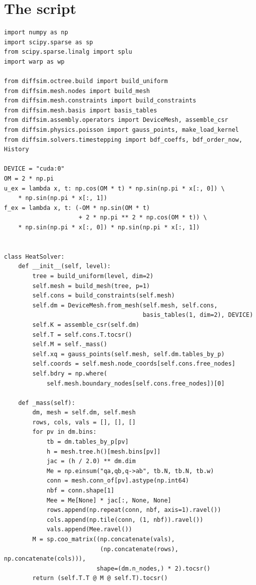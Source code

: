 \section*{The script}
\begin{lstlisting}
import numpy as np
import scipy.sparse as sp
from scipy.sparse.linalg import splu
import warp as wp

from diffsim.octree.build import build_uniform
from diffsim.mesh.nodes import build_mesh
from diffsim.mesh.constraints import build_constraints
from diffsim.mesh.basis import basis_tables
from diffsim.assembly.operators import DeviceMesh, assemble_csr
from diffsim.physics.poisson import gauss_points, make_load_kernel
from diffsim.solvers.timestepping import bdf_coeffs, bdf_order_now, History

DEVICE = "cuda:0"
OM = 2 * np.pi
u_ex = lambda x, t: np.cos(OM * t) * np.sin(np.pi * x[:, 0]) \
    * np.sin(np.pi * x[:, 1])
f_ex = lambda x, t: (-OM * np.sin(OM * t)
                     + 2 * np.pi ** 2 * np.cos(OM * t)) \
    * np.sin(np.pi * x[:, 0]) * np.sin(np.pi * x[:, 1])


class HeatSolver:
    def __init__(self, level):
        tree = build_uniform(level, dim=2)
        self.mesh = build_mesh(tree, p=1)
        self.cons = build_constraints(self.mesh)
        self.dm = DeviceMesh.from_mesh(self.mesh, self.cons,
                                       basis_tables(1, dim=2), DEVICE)
        self.K = assemble_csr(self.dm)
        self.T = self.cons.T.tocsr()
        self.M = self._mass()
        self.xq = gauss_points(self.mesh, self.dm.tables_by_p)
        self.coords = self.mesh.node_coords[self.cons.free_nodes]
        self.bdry = np.where(
            self.mesh.boundary_nodes[self.cons.free_nodes])[0]

    def _mass(self):
        dm, mesh = self.dm, self.mesh
        rows, cols, vals = [], [], []
        for pv in dm.bins:
            tb = dm.tables_by_p[pv]
            h = mesh.tree.h()[mesh.bins[pv]]
            jac = (h / 2.0) ** dm.dim
            Me = np.einsum("qa,qb,q->ab", tb.N, tb.N, tb.w)
            conn = mesh.conn_of[pv].astype(np.int64)
            nbf = conn.shape[1]
            Mee = Me[None] * jac[:, None, None]
            rows.append(np.repeat(conn, nbf, axis=1).ravel())
            cols.append(np.tile(conn, (1, nbf)).ravel())
            vals.append(Mee.ravel())
        M = sp.coo_matrix((np.concatenate(vals),
                           (np.concatenate(rows), np.concatenate(cols))),
                          shape=(dm.n_nodes,) * 2).tocsr()
        return (self.T.T @ M @ self.T).tocsr()


\end{lstlisting}

